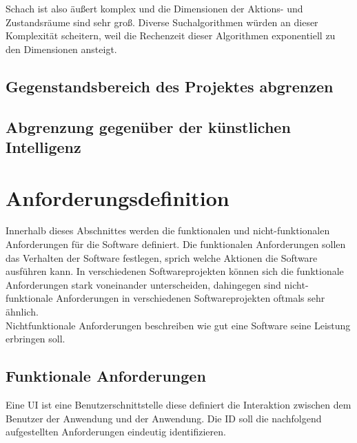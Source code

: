 Schach ist also äußert komplex und die Dimensionen der Aktions- und Zustandsräume sind sehr groß. Diverse Suchalgorithmen würden an dieser Komplexität scheitern, weil die Rechenzeit dieser Algorithmen exponentiell zu den Dimensionen ansteigt. 


\subsection{Gegenstandsbereich des Projektes abgrenzen}

\subsection{Abgrenzung gegenüber der künstlichen Intelligenz}

\section{Anforderungsdefinition}
\label{sec:anforderungsdefinition}
Innerhalb dieses Abschnittes werden die funktionalen und nicht-funktionalen Anforderungen für die Software definiert. Die funktionalen Anforderungen sollen das Verhalten der Software festlegen, sprich welche Aktionen die Software ausführen kann. In verschiedenen Softwareprojekten können sich die funktionale Anforderungen stark voneinander unterscheiden, dahingegen sind nicht-funktionale Anforderungen in verschiedenen Softwareprojekten oftmals sehr ähnlich.\\ 
Nichtfunktionale Anforderungen beschreiben wie gut eine Software seine Leistung erbringen soll.

\subsection{Funktionale Anforderungen}

Eine \ac{UI} ist eine Benutzerschnittstelle diese definiert die Interaktion zwischen dem Benutzer der Anwendung und der Anwendung. Die \ac{ID} soll die nachfolgend aufgestellten Anforderungen eindeutig identifizieren.

